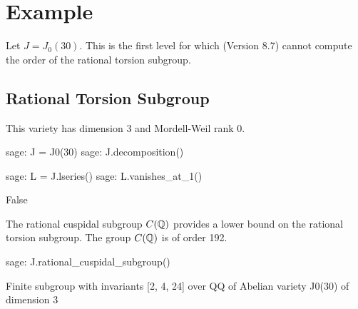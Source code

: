 \section{Example}
\label{sec:example}

Let $J=J_0(30)$. This is the first level for which \sage (Version 8.7) cannot
compute the order of the rational torsion subgroup. 

\subsection{Rational Torsion Subgroup}

This variety has dimension
3 and Mordell-Weil rank 0.
\begin{sagecode}
\begin{sagecell}
sage: J = J0(30)
sage: J.decomposition()
\end{sagecell}
\begin{sageout}
\end{sageout}
\end{sagecode}
\begin{sagecode}
\begin{sagecell}
sage: L = J.lseries()
sage: L.vanishes_at_1()
\end{sagecell}
\begin{sageout}
False
\end{sageout}
\end{sagecode}

The rational cuspidal subgroup $C(\mathbb{Q})$ provides a lower bound on the rational
torsion subgroup. The group $C(\mathbb{Q})$ is of order 192.
\begin{sagecode}
\begin{sagecell}
sage: J.rational_cuspidal_subgroup()
\end{sagecell}
\begin{sageout}
Finite subgroup with invariants [2, 4, 24] over QQ of Abelian variety J0(30) of dimension 3
\end{sageout}
\end{sagecode}

